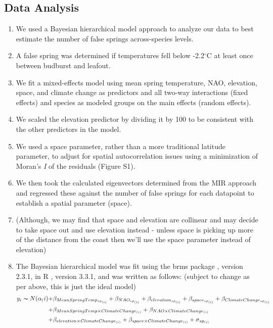 \documentclass{article}\usepackage[]{graphicx}\usepackage[]{color}
\begin{document}
\subsection*{Data Analysis}
\begin{enumerate}
\item We used a Bayesian hierarchical model approach to analyze our data to best estimate the number of false springs across-species levels. 
\item A false spring was determined if temperatures fell below -2.2$^{\circ}$C at least once between budburst and leafout.
\item We fit a mixed-effects model using mean spring temperature, NAO, elevation, space, and climate change as predictors and all two-way interactions (fixed effects) and species as modeled groups on the main effects (random effects).
\item We scaled the elevation predictor by dividing it by 100 to be consistent with the other predictors in the model.
\item We used a space parameter, rather than a more traditional latitude parameter, to adjust for spatial autocorrelation issues using a minimization of Moran's \textit{I} of the residuals \citep{Baumen2017} (Figure S1).
\item We then took the calculated eigenvectors determined from the MIR approach and regressed these against the number of false springs for each datapoint to establish a spatial parameter (space). %
\item (Although, we may find that space and elevation are collinear and may decide to take space out and use elevation instead - unless space is picking up more of the distance from the coast then we'll use the space parameter instead of elevation)
\item The Bayesian hierarchical model was fit using the brms package \citep{brms}, version 2.3.1,  in R \citep{R}, version 3.3.1, and was written as follows: (subject to change as per above, this is just the ideal model)
\begin{align*} \label{eq:1} %
y_i \thicksim N(\alpha_(i) +& \beta_{MeanSpringTemp_{sp_{(i)}}} + \beta_{NAO_{sp_{(i)}}} + \beta_{elevation_{sp_{(i)}}}
+ \beta_{space_{sp_{(i)}}} + \beta_{ClimateChange_{sp_{(i)}}} \\
+& \beta_{MeanSpringTemp \times Climate Change_{(i)}} + \beta_{NAO \times Climate Change_{(i)}} \\
+& \beta_{elevation \times Climate Change_{(i)}} + \beta_{space \times Climate Change_{(i)}} + \sigma_{sp_{(i)}} 

\end{align*}
\end{enumerate}
\end{document}
